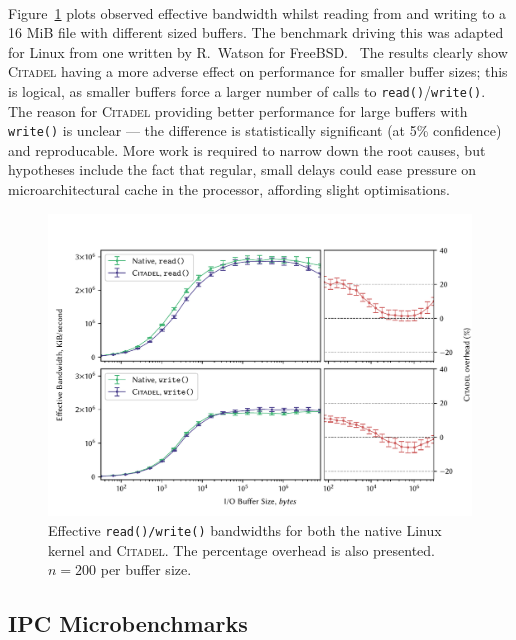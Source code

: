 \paragraph{} Figure~\ref{fig:io-graph} plots observed effective bandwidth whilst reading from and writing to a 16 MiB file with different sized buffers. The benchmark driving this was adapted for Linux from one written by R.~Watson for FreeBSD.~\cite{l41-benchmark} The results clearly show \textsc{Citadel} having a more adverse effect on performance for smaller buffer sizes; this is logical, as smaller buffers force a larger number of calls to \texttt{read()}/\texttt{write()}. The reason for \textsc{Citadel} providing better performance for large buffers with \texttt{write()} is unclear --- the difference is statistically significant (at 5\% confidence) and reproducable. More work is required to 
narrow down the root causes, but hypotheses include the fact that regular, small delays could ease pressure on microarchitectural cache in the processor, affording slight optimisations.
\begin{figure}[]
    \centering
    \includegraphics[width=\linewidth]{figures/graphs/io.pdf}
    \vspace{-5mm}
    \captionsetup{justification=centering}
    \caption[Effective \texttt{read()/write()} bandwidths for both the native Linux kernel and \textsc{Citadel}.]{Effective \texttt{read()/write()} bandwidths for both the native Linux kernel and \textsc{Citadel}. The percentage overhead is also presented. $n=200$ per buffer size.}
    \label{fig:io-graph}
\end{figure}


\subsection{IPC Microbenchmarks}
\label{sec:ipc-microbenchmarks}

